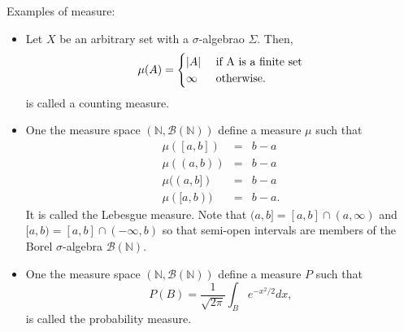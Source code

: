 \documentclass{article}
\newcommand{\son}{\mathbb{N}}
\theoremstyle{plain}
\numberwithin{thm}{section}
\theoremstyle{plain}
\numberwithin{prop}{section}
\theoremstyle{definition}
\numberwithin{defn}{section}
\theoremstyle{remark}
\theoremstyle{plain}
\numberwithin{cor}{section}
\numberwithin{equation}{section}
\begin{document}
Examples of measure:
\begin{itemize}
\item Let $X$ be an arbitrary set with a $\sigma$-algebrao $\Sigma$. Then,
\[
\mu(A) = \begin{cases} |A| & \text{ if } $A$ \text{ is a finite set} \\
\infty & \text{ otherwise.}
\end{cases}
\]
is called a counting measure.

\item One the measure space $(\son, \mathcal{B}(\son))$ define a 
measure $\mu$ such that
\begin{eqnarray*}
\mu([a, b]) &=& b - a \\
\mu((a, b)) &=& b - a \\
\mu((a, b]) &=& b - a \\
\mu([a, b)) &=& b - a.
\end{eqnarray*}
It is called the Lebesgue measure. Note that $(a, b] = [a, b] \cap (a, \infty)$
and $[a, b) = [a, b] \cap (-\infty, b)$ so that semi-open intervals are members
of the Borel $\sigma$-algebra $\mathcal{B}(\son)$.

\item One the measure space $(\son, \mathcal{B}(\son))$ define a 
measure $P$ such that
\[
P(B) = \frac{1}{\sqrt{2\pi}}\int_B e^{-x^2/2}dx,
\]
is called the probability measure.
\end{itemize}
\end{document}
